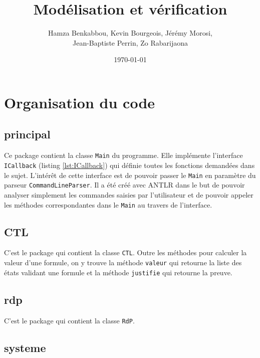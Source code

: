 \documentclass[dvipsnames]{report}
\begin{document}
\title{Modélisation et vérification}   %
\author{Hamza Benkabbou, Kevin Bourgeois, Jérémy Morosi,\\Jean-Baptiste Perrin, Zo Rabarijaona}         %
\date{\today}    %
\maketitle

\tableofcontents

\newpage

\section{Organisation du code}

\subsection{principal}

Ce package contient la classe \texttt{Main} du programme. Elle implémente l'interface \texttt{ICallback} (listing \ref{lst:ICallback}) qui définie toutes les fonctions demandées dans le sujet. L'intérêt de cette interface est de pouvoir passer le \texttt{Main} en paramètre du parseur \texttt{CommandLineParser}. Il a été créé avec ANTLR dans le but de pouvoir analyser simplement les commandes saisies par l'utilisateur et de pouvoir appeler les méthodes correspondantes dans le \texttt{Main} au travers de l'interface.

\subsection{CTL}

C'est le package qui contient la classe \texttt{CTL}. Outre les méthodes pour calculer la valeur d'une formule, on y trouve la méthode \texttt{valeur} qui retourne la liste des états validant une formule et la méthode \texttt{justifie} qui retourne la preuve.

\subsection{rdp}

C'est le package qui contient la classe \texttt{RdP}.

\subsection{systeme}
\end{document}
